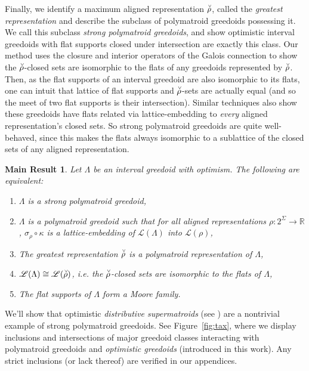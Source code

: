 \documentclass[11pt]{article}
\newtheorem{mresult}{Main Result}
\newcommand{\univ}{\Sigma}
\newcommand{\glang}{\Lambda}
\providecommand{\L}{}
\renewcommand{\L}{\mathscr{L}}
\begin{document}
Finally, we identify a maximum aligned representation $\accentset{\vee}{\rho}$, called the \emph{greatest representation} and describe the subclass of polymatroid greedoids possessing it.
We call this subclass \emph{strong polymatroid greedoids}, and show optimistic interval greedoids with flat supports closed under intersection are exactly this class.
Our method uses the closure and interior operators of the Galois connection to show the $\accentset{\vee}{\rho}$-closed sets are isomorphic to the flats of any greedoids represented by $\accentset{\vee}{\rho}$.
Then, as the flat supports of an interval greedoid are also isomorphic to its flats, one can intuit that lattice of flat supports and $\accentset{\vee}{\rho}$-sets are actually equal (and so the meet of two flat supports is their intersection).
Similar techniques also show these greedoids have flats related via lattice-embedding to \emph{every} aligned representation's closed sets.
So strong polymatroid greedoids are quite well-behaved, since this makes the flats always isomorphic to a sublattice of the closed sets of any aligned representation.

\begin{mresult}\label{mr:strong-pm-greedoid}
    Let $\glang$ be an interval greedoid with optimism.
    The following are equivalent:
    \begin{enumerate}
        \item $\glang$ is a strong polymatroid greedoid,
        \item $\glang$ is a polymatroid greedoid such that for all aligned representations $\rho:2^\univ\to\mathbb{R}$, $\sigma_\rho\circ\kappa$ is a lattice-embedding of $\L(\glang)$ into $\L(\rho)$,
        \item The greatest representation $\accentset{\vee}{\rho}$ is a polymatroid representation of $\glang$,
        \item $\L(\glang)\cong\L(\accentset{\vee}{\rho})$, i.e. the $\accentset{\vee}{\rho}$-closed sets are isomorphic to the flats of $\glang$,
        \item The flat supports of $\glang$ form a Moore family.
    \end{enumerate}
\end{mresult}

We'll show that optimistic \emph{distributive supermatroids} (see \cite{tardos1990intersection}) are a nontrivial example of strong polymatroid greedoids.
See Figure~\ref{fig:tax}, where we display inclusions and intersections of major greedoid classes interacting with polymatroid greedoids and \emph{optimistic greedoids} (introduced in this work).
Any strict inclusions (or lack thereof) are verified in our appendices.
\end{document}
